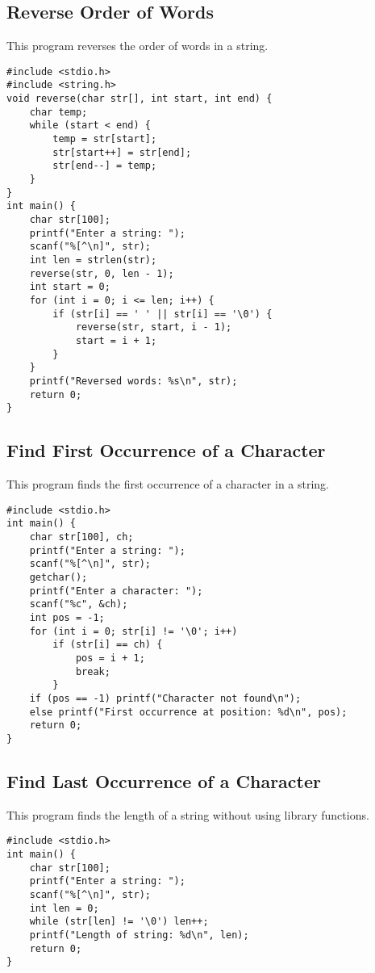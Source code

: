 \documentclass[a4paper,12pt]{article}
\begin{document}
\subsection{Reverse Order of Words}
This program reverses the order of words in a string.
\begin{lstlisting}[caption={Reverse Order of Words}]
#include <stdio.h>
#include <string.h>
void reverse(char str[], int start, int end) {
    char temp;
    while (start < end) {
        temp = str[start];
        str[start++] = str[end];
        str[end--] = temp;
    }
}
int main() {
    char str[100];
    printf("Enter a string: ");
    scanf("%[^\n]", str);
    int len = strlen(str);
    reverse(str, 0, len - 1);
    int start = 0;
    for (int i = 0; i <= len; i++) {
        if (str[i] == ' ' || str[i] == '\0') {
            reverse(str, start, i - 1);
            start = i + 1;
        }
    }
    printf("Reversed words: %s\n", str);
    return 0;
}
\end{lstlisting}
\clearpage

\subsection{Find First Occurrence of a Character}
This program finds the first occurrence of a character in a string.
\begin{lstlisting}[caption={Find First Occurrence of a Character}]
#include <stdio.h>
int main() {
    char str[100], ch;
    printf("Enter a string: ");
    scanf("%[^\n]", str);
    getchar();
    printf("Enter a character: ");
    scanf("%c", &ch);
    int pos = -1;
    for (int i = 0; str[i] != '\0'; i++)
        if (str[i] == ch) {
            pos = i + 1;
            break;
        }
    if (pos == -1) printf("Character not found\n");
    else printf("First occurrence at position: %d\n", pos);
    return 0;
}
\end{lstlisting}
\clearpage

\subsection{Find Last Occurrence of a Character}
This program finds the length of a string without using library functions.
\begin{lstlisting}[caption={Find Length of a String}]
#include <stdio.h>
int main() {
    char str[100];
    printf("Enter a string: ");
    scanf("%[^\n]", str);
    int len = 0;
    while (str[len] != '\0') len++;
    printf("Length of string: %d\n", len);
    return 0;
}
\end{lstlisting}
\clearpage
\end{document}
